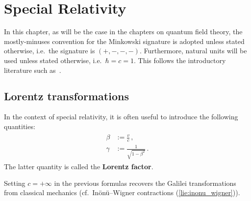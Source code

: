 \chapter{Special Relativity}

    In this chapter, as will be the case in the chapters on quantum field theory, the mostly-minuses convention for the Minkowski signature is adopted unless stated otherwise, i.e.~the signature is $(+,-,-,-)$. Furthermore, natural units will be used unless stated otherwise, i.e.~$\hbar = c = 1$. This follows the introductory literature such as~\citet{greiner_field_1996,peskin_introduction_1995}.

    \minitoc

\section{Lorentz transformations}

    \begin{notation}
        In the context of special relativity, it is often useful to introduce the following quantities:
        \begin{gather}
            \label{relativity:lorentz_factor}
            \begin{aligned}
                \beta &:= \frac{v}{c}\,,\\
                \gamma &:= \frac{1}{\sqrt{1 - \beta^2}}\,.
            \end{aligned}
        \end{gather}
        The latter quantity is called the \textbf{Lorentz factor}.
    \end{notation}
    \begin{remark}
        Setting $c=+\infty$ in the previous formulas recovers the Galilei transformations from classical mechanics (cf.~In\"on\"u--Wigner contractions (\cref{lie:inonu_wigner})).
    \end{remark}

